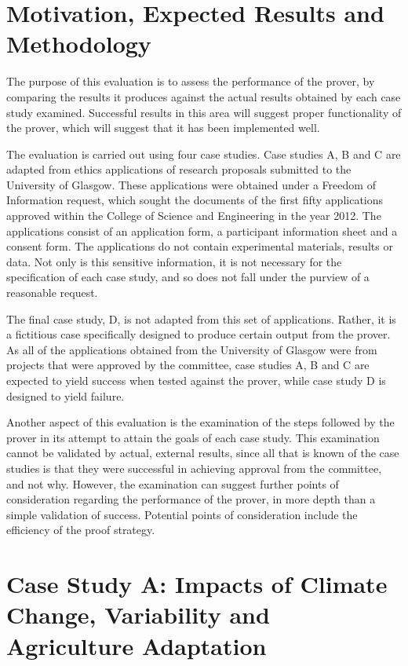 \documentclass{l4proj}
\begin{document}
\section{Motivation, Expected Results and Methodology}
The purpose of this evaluation is to assess the performance of the prover, by comparing the results it produces against the actual results obtained by each case study examined. Successful results in this area will suggest proper functionality of the prover, which will suggest that it has been implemented well. 

The evaluation is carried out using four case studies. Case studies A, B and C are adapted from ethics applications of research proposals submitted to the University of Glasgow. These applications were obtained under a Freedom of Information request, which sought the documents of the first fifty applications approved within the College of Science and Engineering in the year 2012. The applications consist of an application form, a participant information sheet and a consent form. The applications do not contain experimental materials, results or data. Not only is this sensitive information, it is not necessary for the specification of each case study, and so does not fall under the purview of a reasonable request. 

The final case study, D, is not adapted from this set of applications. Rather, it is a fictitious case specifically designed to produce certain output from the prover. As all of the applications obtained from the University of Glasgow were from projects that were approved by the committee, case studies A, B and C are expected to yield success when tested against the prover, while case study D is designed to yield failure. 

Another aspect of this evaluation is the examination of the steps followed by the prover in its attempt to attain the goals of each case study. This examination cannot be validated by actual, external results, since all that is known of the case studies is that they were successful in achieving approval from the committee, and not why. However, the examination can suggest further points of consideration regarding the performance of the prover, in more depth than a simple validation of success. Potential points of consideration include the efficiency of the proof strategy. 

\section{Case Study A: Impacts of Climate Change, Variability and Agriculture Adaptation}
\end{document}
